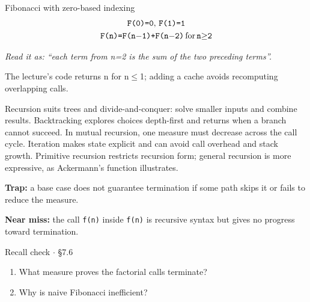 \documentclass[11pt]{article}
\begin{document}
\begin{keepsection}
\begin{equationcard}{Fibonacci with zero-based indexing}
\[ \begin{gathered} \texttt{F(0)=0},\, \texttt{F(1)=1} \\ \texttt{F(n)=F(n\ensuremath{-}1)+F(n\ensuremath{-}2)}\, \text{for}\, \texttt{n\ensuremath{\geq}2} \end{gathered} \]
{\small \emph{Read it as: “each term from n=2 is the sum of the two preceding terms”.}\par The lecture’s code returns n for n\ensuremath{\leq}1; adding a cache avoids recomputing overlapping calls.}
\end{equationcard}

Recursion suits trees and divide-and-conquer: solve smaller inputs and combine results. Backtracking explores choices depth-first and returns when a branch cannot succeed. In mutual recursion, one measure must decrease across the call cycle. Iteration makes state explicit and can avoid call overhead and stack growth. Primitive recursion restricts recursion form; general recursion is more expressive, as Ackermann’s function illustrates.

\begin{notebox}\textbf{Trap:} a base case does not guarantee termination if some path skips it or fails to reduce the measure.\end{notebox}

\begin{notebox}\textbf{Near miss:} the call \texttt{f(n)} inside \texttt{f(n)} is recursive syntax but gives no progress toward termination.\end{notebox}

\begin{recallbox}{Recall check \ensuremath{\cdot} §7.6}
\begin{enumerate}
\item What measure proves the factorial calls terminate?
\item Why is naive Fibonacci inefficient?
\end{enumerate}

\end{recallbox}
\end{keepsection}
\end{document}
